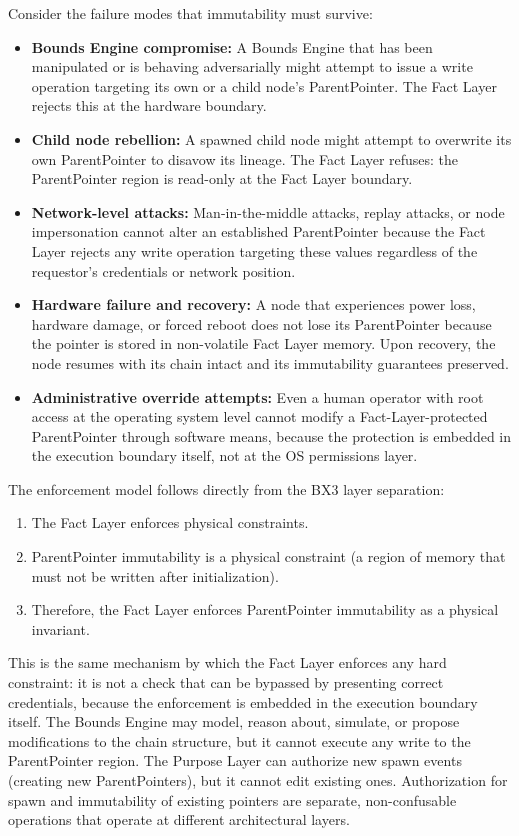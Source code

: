 Consider the failure modes that immutability must survive:

\begin{itemize}[noitemsep]
    \item \textbf{Bounds Engine compromise:} A Bounds Engine that has been manipulated or is behaving adversarially might attempt to issue a write operation targeting its own or a child node's ParentPointer. The Fact Layer rejects this at the hardware boundary.
    \item \textbf{Child node rebellion:} A spawned child node might attempt to overwrite its own ParentPointer to disavow its lineage. The Fact Layer refuses: the ParentPointer region is read-only at the Fact Layer boundary.
    \item \textbf{Network-level attacks:} Man-in-the-middle attacks, replay attacks, or node impersonation cannot alter an established ParentPointer because the Fact Layer rejects any write operation targeting these values regardless of the requestor's credentials or network position.
    \item \textbf{Hardware failure and recovery:} A node that experiences power loss, hardware damage, or forced reboot does not lose its ParentPointer because the pointer is stored in non-volatile Fact Layer memory. Upon recovery, the node resumes with its chain intact and its immutability guarantees preserved.
    \item \textbf{Administrative override attempts:} Even a human operator with root access at the operating system level cannot modify a Fact-Layer-protected ParentPointer through software means, because the protection is embedded in the execution boundary itself, not at the OS permissions layer.
\end{itemize}

The enforcement model follows directly from the BX3 layer separation:

\begin{enumerate}[noitemsep]
    \item The Fact Layer enforces physical constraints.
    \item ParentPointer immutability is a physical constraint (a region of memory that must not be written after initialization).
    \item Therefore, the Fact Layer enforces ParentPointer immutability as a physical invariant.
\end{enumerate}

This is the same mechanism by which the Fact Layer enforces any hard constraint: it is not a check that can be bypassed by presenting correct credentials, because the enforcement is embedded in the execution boundary itself. The Bounds Engine may model, reason about, simulate, or propose modifications to the chain structure, but it cannot execute any write to the ParentPointer region. The Purpose Layer can authorize new spawn events (creating new ParentPointers), but it cannot edit existing ones. Authorization for spawn and immutability of existing pointers are separate, non-confusable operations that operate at different architectural layers.

